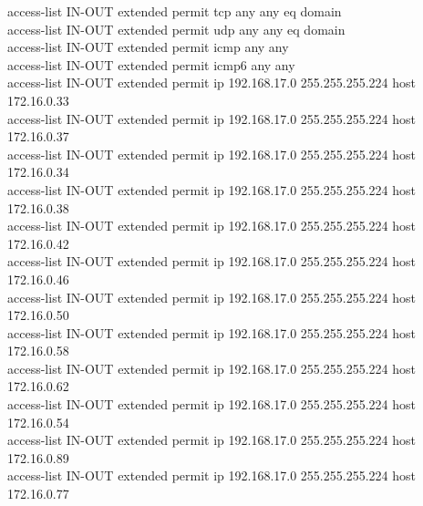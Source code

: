 \documentclass[a4paper, 12pt]{article}
\begin{document}
{\hspace*{1cm}access-list IN-OUT extended permit tcp any any eq domain\\
\hspace*{1cm}access-list IN-OUT extended permit udp any any eq domain\\
\hspace*{1cm}access-list IN-OUT extended permit icmp any any\\
\hspace*{1cm}access-list IN-OUT extended permit icmp6 any any\\
\hspace*{1cm}access-list IN-OUT extended permit ip 192.168.17.0 255.255.255.224 host 172.16.0.33\\
\hspace*{1cm}access-list IN-OUT extended permit ip 192.168.17.0 255.255.255.224 host 172.16.0.37\\
\hspace*{1cm}access-list IN-OUT extended permit ip 192.168.17.0 255.255.255.224 host 172.16.0.34\\
\hspace*{1cm}access-list IN-OUT extended permit ip 192.168.17.0 255.255.255.224 host 172.16.0.38\\
\hspace*{1cm}access-list IN-OUT extended permit ip 192.168.17.0 255.255.255.224 host 172.16.0.42\\
\hspace*{1cm}access-list IN-OUT extended permit ip 192.168.17.0 255.255.255.224 host 172.16.0.46\\
\hspace*{1cm}access-list IN-OUT extended permit ip 192.168.17.0 255.255.255.224 host 172.16.0.50\\
\hspace*{1cm}access-list IN-OUT extended permit ip 192.168.17.0 255.255.255.224 host 172.16.0.58\\
\hspace*{1cm}access-list IN-OUT extended permit ip 192.168.17.0 255.255.255.224 host 172.16.0.62\\
\hspace*{1cm}access-list IN-OUT extended permit ip 192.168.17.0 255.255.255.224 host 172.16.0.54\\
\hspace*{1cm}access-list IN-OUT extended permit ip 192.168.17.0 255.255.255.224 host 172.16.0.89\\
\hspace*{1cm}access-list IN-OUT extended permit ip 192.168.17.0 255.255.255.224 host 172.16.0.77\\
}
\end{document}

